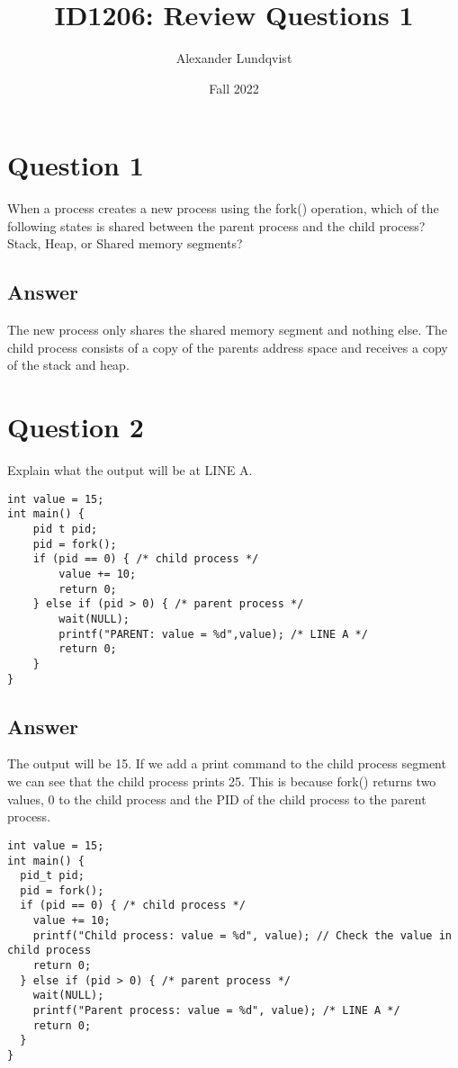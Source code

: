 \documentclass[a4paper,11pt]{article}
\begin{document}
\title{
    \textbf{ID1206: Review Questions 1}
}
\author{Alexander Lundqvist}
\date{Fall 2022}

\maketitle

\section{Question 1}
When a process creates a new process using the fork() operation, which of the following states is shared
between the parent process and the child process? Stack, Heap, or Shared memory segments?

\subsection{Answer}
The new process only shares the shared memory segment and nothing else. The child process consists of a copy of the parents address space and receives a copy of the stack and heap.

\pagebreak
\section{Question 2}
Explain what the output will be at LINE A.
\begin{verbatim}
int value = 15;
int main() {
    pid t pid;
    pid = fork();
    if (pid == 0) { /* child process */
        value += 10;
        return 0;
    } else if (pid > 0) { /* parent process */
        wait(NULL);
        printf("PARENT: value = %d",value); /* LINE A */
        return 0;
    }
}
\end{verbatim}
\subsection{Answer}
The output will be 15. If we add a print command to the child process segment we can see that the child process prints 25. This is because fork() returns two values, 0 to the child process and the PID of the child process to the parent process.
\begin{verbatim}
int value = 15;
int main() {
  pid_t pid;
  pid = fork();
  if (pid == 0) { /* child process */
    value += 10;
    printf("Child process: value = %d", value); // Check the value in child process
    return 0;
  } else if (pid > 0) { /* parent process */
    wait(NULL);
    printf("Parent process: value = %d", value); /* LINE A */
    return 0;
  }
}
\end{verbatim}
\end{document}
